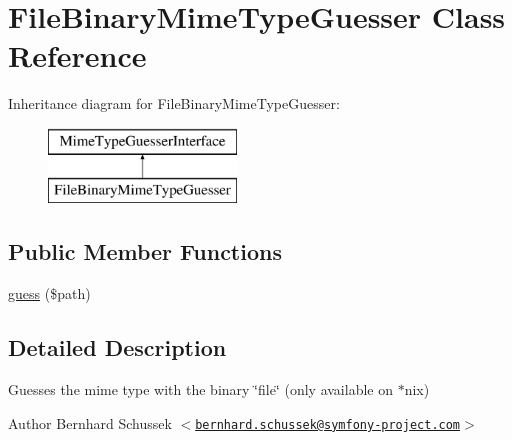 \hypertarget{class_symfony_1_1_component_1_1_http_foundation_1_1_file_1_1_mime_type_1_1_file_binary_mime_type_guesser}{
\section{\-File\-Binary\-Mime\-Type\-Guesser \-Class \-Reference}
\label{class_symfony_1_1_component_1_1_http_foundation_1_1_file_1_1_mime_type_1_1_file_binary_mime_type_guesser}
}
\-Inheritance diagram for \-File\-Binary\-Mime\-Type\-Guesser\-:\begin{figure}[H]
\begin{center}
\leavevmode
\includegraphics[height=2.000000cm]{class_symfony_1_1_component_1_1_http_foundation_1_1_file_1_1_mime_type_1_1_file_binary_mime_type_guesser}
\end{center}
\end{figure}
\subsection*{\-Public \-Member \-Functions}
\begin{DoxyCompactItemize}
\item 
\hyperlink{class_symfony_1_1_component_1_1_http_foundation_1_1_file_1_1_mime_type_1_1_file_binary_mime_type_guesser_af42fcbb87eebfa7fa5e31c9c42af0c1a}{guess} (\$path)
\end{DoxyCompactItemize}


\subsection{\-Detailed \-Description}
\-Guesses the mime type with the binary \char`\"{}file\char`\"{} (only available on $\ast$nix)

\begin{DoxyAuthor}{\-Author}
\-Bernhard \-Schussek $<$\href{mailto:bernhard.schussek@symfony-project.com}{\tt bernhard.\-schussek@symfony-\/project.\-com}$>$ 
\end{DoxyAuthor}


